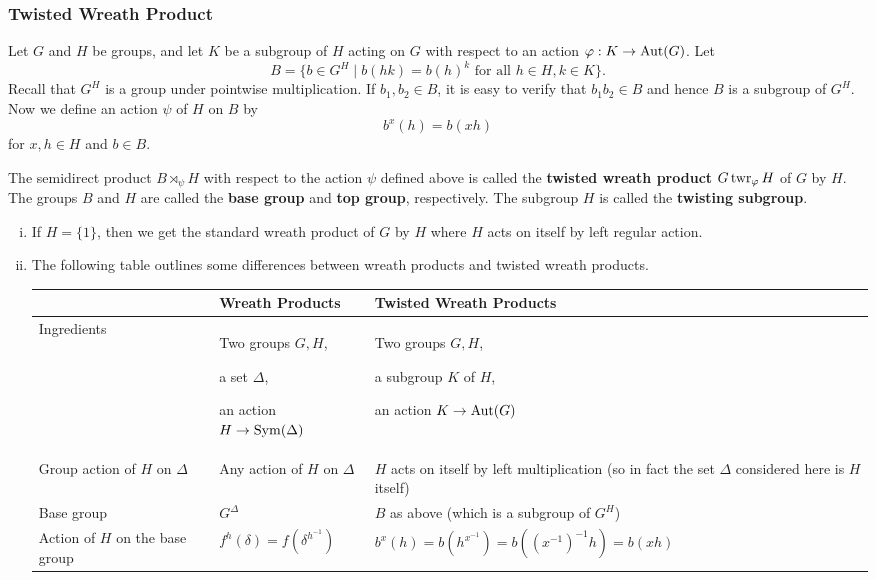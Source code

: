 \subsubsection{Twisted Wreath Product} 
Let $G$ and $H$ be groups, and let $K$ be a subgroup of $H$ acting on $G$ with respect to an action $\varphi:K\rightarrow \operatorname{Aut} (G)$. Let 
\begin{equation*}
	B = \{b\in G^H\mid b(hk) = b(h)^k\text{ for all }h\in H,k\in K\}.
\end{equation*}
Recall that $G^H$ is a group under pointwise multiplication. If $b_1,b_2\in B$, it is easy to verify that $b_1b_2\in B$ and hence $B$ is a subgroup of $G^H$. Now we define an action $\psi$ of $H$ on $B$ by
\begin{equation*}
	b^x(h) = b(xh)
\end{equation*}
for $x,h\in H$ and $b\in B$.
\begin{definition}
	The semidirect product $B\rtimes_\psi H$ with respect to the action $\psi$ defined above is called the \textbf{twisted wreath product} $G\operatorname{twr}_\varphi H$ of $G$ by $H$. The groups $B$ and $H$ are called the \textbf{base group} and \textbf{top group}, respectively. The subgroup $H$ is called the \textbf{twisting subgroup}.
\end{definition}
\begin{remark}
	\begin{enumerate}[(i)]
		\item If $H = \{1\}$, then we get the standard wreath product of $G$ by $H$ where $H$ acts on itself by left regular action.
		\item The following table outlines some differences between wreath products and twisted wreath products.
\begin{center}
	\begin{tabular}{|p{1.7cm}|p{3.6cm}|p{5.2cm}|}
		\hline
		  & Wreath Products & Twisted Wreath Products  \\
\hline \hline
Ingredients & Two groups $G,H$, 

a set $\Delta$, 

an action $H\to\operatorname{Sym}(\Delta)$ & Two groups $G,H$,

a subgroup $K$ of $H$,

an action $K\to \operatorname{Aut}(G)$  \\
\hline
Group action of $H$ on $\Delta$ & Any action of $H$ on $\Delta$ & $H$ acts on itself by left multiplication (so in fact the set $\Delta$ considered here is $H$ itself) \\
\hline
Base group & $G^\Delta$ & $B$ as above (which is a subgroup of $G^H$) \\
\hline
Action of $H$ on the base group & $f^h(\delta) = f(\delta^{h^{-1}})$ & $b^x(h) = b(h^{x^{-1}}) = b((x^{-1})^{-1}h) = b(xh)$ \\
\hline
\end{tabular}
\end{center}
\end{enumerate}
\end{remark}


